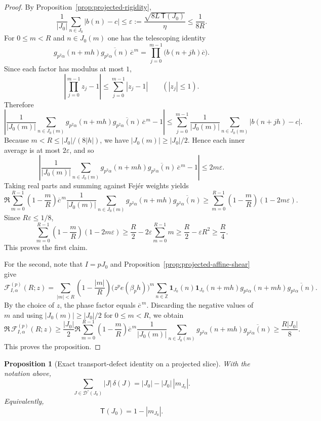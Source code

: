 \documentclass[11pt]{scrartcl}
\numberwithin{equation}{section}
\newtheorem{proposition}[theorem]{Proposition}
\theoremstyle{definition}
\newcommand{\Z}{\mathbb Z}
\newcommand{\1}{\mathbf 1}
\newcommand{\ee}[1]{e\!\left(#1\right)}
\begin{document}
\begin{proof}
By Proposition~\ref{prop:projected-rigidity},
\[
\frac1{|J_0|}\sum_{n\in J_0}|b(n)-c|\le \varepsilon
:=\frac{\sqrt{8L\,\mathsf T(J_0)}}{\eta}
\le \frac{1}{8R}.
\]
For $0\le m<R$ and $n\in J_0(m)$ one has the telescoping identity
\[
g_{p^2\alpha}(n+mh)\overline{g_{p^2\alpha}(n)}\,\overline c^{\,m}
=
\prod_{j=0}^{m-1}\bigl(b(n+jh)\overline c\bigr).
\]
Since each factor has modulus at most $1$,
\[
\left|\prod_{j=0}^{m-1} z_j-1\right|\le \sum_{j=0}^{m-1}|z_j-1|
\qquad (|z_j|\le 1).
\]
Therefore
\[
\left|
\frac1{|J_0(m)|}\sum_{n\in J_0(m)}g_{p^2\alpha}(n+mh)\overline{g_{p^2\alpha}(n)}\,\overline c^{\,m}-1
\right|
\le
\sum_{j=0}^{m-1}
\frac1{|J_0(m)|}\sum_{n\in J_0(m)}|b(n+jh)-c|.
\]
Because $m<R\le |J_0|/(8|h|)$, we have $|J_0(m)|\ge |J_0|/2$. Hence each inner average is at most $2\varepsilon$, and so
\[
\left|
\frac1{|J_0(m)|}\sum_{n\in J_0(m)}g_{p^2\alpha}(n+mh)\overline{g_{p^2\alpha}(n)}\,\overline c^{\,m}-1
\right|
\le 2m\varepsilon.
\]
Taking real parts and summing against Fej\'er weights yields
\[
\Re\sum_{m=0}^{R-1}\left(1-\frac{m}{R}\right)
\overline c^{\,m}
\frac1{|J_0(m)|}
\sum_{n\in J_0(m)} g_{p^2\alpha}(n+mh)\overline{g_{p^2\alpha}(n)}
\ge
\sum_{m=0}^{R-1}\left(1-\frac{m}{R}\right)(1-2m\varepsilon).
\]
Since $R\varepsilon\le 1/8$,
\[
\sum_{m=0}^{R-1}\left(1-\frac{m}{R}\right)(1-2m\varepsilon)
\ge \frac{R}{2}-2\varepsilon\sum_{m=0}^{R-1}m
\ge \frac{R}{2}-\varepsilon R^2
\ge \frac{R}{4}.
\]
This proves the first claim.

For the second, note that $I=pJ_0$ and Proposition~\ref{prop:projected-affine-shear} give
\[
\mathcal F^{(p)}_{I,\alpha}(R;z)
=
\sum_{|m|<R}\left(1-\frac{|m|}{R}\right)
\bigl(z^p\ee{\beta_ph}\bigr)^m
\sum_{n\in\Z}\1_{J_0}(n)\1_{J_0}(n+mh)
 g_{p^2\alpha}(n+mh)\overline{g_{p^2\alpha}(n)}.
\]
By the choice of $z$, the phase factor equals $\overline c^{\,m}$. Discarding the negative values of $m$ and using $|J_0(m)|\ge |J_0|/2$ for $0\le m<R$, we obtain
\[
\Re\,\mathcal F^{(p)}_{I,\alpha}(R;z)
\ge \frac{|J_0|}{2}
\Re\sum_{m=0}^{R-1}\left(1-\frac{m}{R}\right)
\overline c^{\,m}
\frac1{|J_0(m)|}
\sum_{n\in J_0(m)} g_{p^2\alpha}(n+mh)\overline{g_{p^2\alpha}(n)}
\ge \frac{R|J_0|}{8}.
\]
This proves the proposition.
\end{proof}

\begin{proposition}[Exact transport-defect identity on a projected slice]
\label{prop:projected-transport-identity}
With the notation above,
\[
\sum_{J\in\mathcal D^\circ(J_0)} |J|\,\delta(J)
=
|J_0|-|J_0|\,|m_{J_0}|.
\]
Equivalently,
\[
\mathsf T(J_0)=1-|m_{J_0}|.
\]
\end{proposition}
\end{document}

